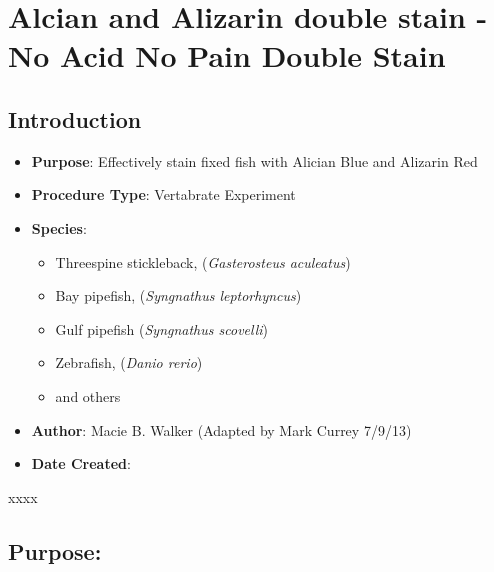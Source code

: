 \documentclass[
  letterpaper,
  DIV=11,
  numbers=noendperiod]{scrreprt}
\providecommand{\tightlist}{%
  \setlength{\itemsep}{0pt}\setlength{\parskip}{0pt}}\usepackage{longtable,booktabs,array}
\begin{document}
\hypertarget{sec-vert_exp-doublestain}{%
\chapter{Alcian and Alizarin double stain - No Acid No Pain Double
Stain}\label{sec-vert_exp-doublestain}}

\hypertarget{introduction-72}{%
\section{Introduction}\label{introduction-72}}

\begin{itemize}
\tightlist
\item
  \textbf{Purpose}: Effectively stain fixed fish with Alician Blue and
  Alizarin Red
\item
  \textbf{Procedure Type}: Vertabrate Experiment
\item
  \textbf{Species}:

  \begin{itemize}
  \tightlist
  \item
    Threespine stickleback, (\emph{Gasterosteus aculeatus})
  \item
    Bay pipefish, (\emph{Syngnathus leptorhyncus})
  \item
    Gulf pipefish (\emph{Syngnathus scovelli})
  \item
    Zebrafish, (\emph{Danio rerio})
  \item
    and others
  \end{itemize}
\item
  \textbf{Author}: Macie B. Walker (Adapted by Mark Currey 7/9/13)
\item
  \textbf{Date Created}:
\end{itemize}

\begin{tcolorbox}[enhanced jigsaw, toprule=.15mm, breakable, coltitle=black, leftrule=.75mm, title=\textcolor{quarto-callout-warning-color}{\faExclamationTriangle}\hspace{0.5em}{NOTES}, bottomrule=.15mm, toptitle=1mm, bottomtitle=1mm, colframe=quarto-callout-warning-color-frame, opacityback=0, colback=white, opacitybacktitle=0.6, colbacktitle=quarto-callout-warning-color!10!white, rightrule=.15mm, titlerule=0mm, arc=.35mm, left=2mm]

xxxx

\end{tcolorbox}

\hypertarget{purpose}{%
\section{Purpose:}\label{purpose}}
\end{document}
